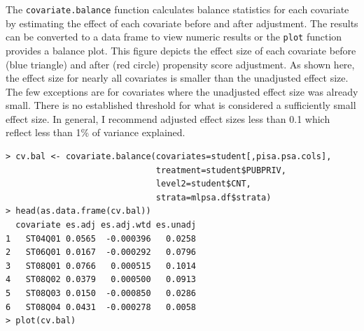 \documentclass[letterpaper,12p,twoside]{article} %
\begin{document}
The \texttt{covariate.balance} function calculates balance statistics for each covariate by estimating the effect of each covariate before and after adjustment. The results can be converted to a data frame to view numeric results or the \texttt{plot} function provides a balance plot. This figure depicts the effect size of each covariate before (blue triangle) and after (red circle) propensity score adjustment. As shown here, the effect size for nearly all covariates is smaller than the unadjusted effect size. The few exceptions are for covariates where the unadjusted effect size was already small. There is no established threshold for what is considered a sufficiently small effect size. In general, I recommend adjusted effect sizes less than 0.1 which reflect less than 1\% of variance explained.

\begin{verbatim}
> cv.bal <- covariate.balance(covariates=student[,pisa.psa.cols],
                              treatment=student$PUBPRIV,
                              level2=student$CNT,
                              strata=mlpsa.df$strata)
> head(as.data.frame(cv.bal))
  covariate es.adj es.adj.wtd es.unadj
1   ST04Q01 0.0565  -0.000396   0.0258
2   ST06Q01 0.0167  -0.000292   0.0796
3   ST08Q01 0.0766   0.000515   0.1014
4   ST08Q02 0.0379   0.000500   0.0913
5   ST08Q03 0.0150  -0.000850   0.0286
6   ST08Q04 0.0431  -0.000278   0.0058
> plot(cv.bal)
\end{verbatim}
\end{document}
